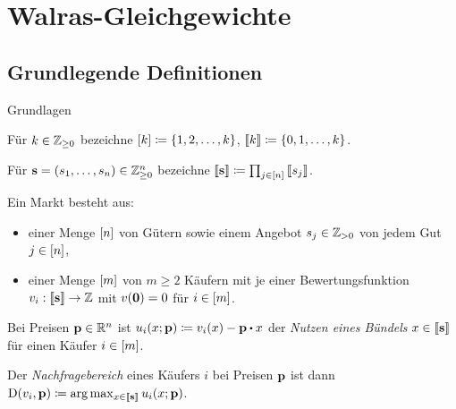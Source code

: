 \section{Walras-Gleichgewichte}
\subsection{Grundlegende Definitionen}

\begin{frame}{Grundlagen}
	\begin{notation}
		Für $k\in\mathbb{Z}_{\geq0}$ bezeichne $\left[ k \right]\coloneqq \{ 1, 2, \dots, k \}$, $\left\llbracket k \right\rrbracket\coloneqq \{0, 1, \dots, k \}$.
		
		\pause
		Für $\mathbf{s}=(s_1, \dots, s_n)\in\mathbb{Z}_{\geq0}^n$ bezeichne $\left\llbracket \mathbf{s} \right\rrbracket\coloneqq \prod_{j\in\left[ n \right]} \left\llbracket s_j \right\rrbracket$.
	\end{notation}
	\begin{definition}[Markt]
		Ein Markt besteht aus:
		\begin{itemize}[label=\color{darkblue}$\bullet$]
			\item einer Menge $\left[ n \right]$ von Gütern sowie einem Angebot $s_j\in\mathbb{Z}_{>0}$ von jedem Gut $j\in\left[ n \right]$,
			\item einer Menge $\left[ m \right]$ von $m\geq 2$ Käufern mit je einer Bewertungsfunktion $v_i:\left\llbracket \mathbf{s} \right\rrbracket \rightarrow \mathbb{Z}$ mit $v(\mathbf{0}) = 0$ für $i\in\left[ m \right]$.
		\end{itemize}
	\end{definition}
	\begin{definition}[Nachfragebereich]
		Bei Preisen $\mathbf{p}\in\mathbb{R}^n$ ist $u_i(x; \fp)\coloneqq v_i(x) - \fp \bcdot x$ der \emph{Nutzen eines Bündels} $x\in\left\llbracket \mathbf{s} \right\rrbracket$ für einen Käufer $i\in\left[ m \right]$.
		
		Der \emph{Nachfragebereich} eines Käufers $i$ bei Preisen $\mathbf{p}$ ist dann $\operatorname{D}(v_i, \mathbf{p})\coloneqq \arg\max_{x\in\left\llbracket \mathbf{s} \right\rrbracket} u_i(x; \mathbf{p})$.
	\end{definition}
\end{frame}

